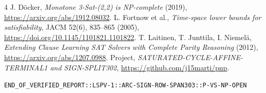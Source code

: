 \documentclass[11pt]{article}
\begin{document}
\begin{thebibliography}{4}
 J. D\"ocker, \emph{Monotone 3-Sat-(2,2) is NP-complete} (2019), \url{https://arxiv.org/abs/1912.08032}.
 L. Fortnow et al., \emph{Time-space lower bounds for satisfiability}, JACM 52(6), 835--865 (2005), \url{https://doi.org/10.1145/1101821.1101822}.
 T. Laitinen, T. Junttila, I. Niemel\"a, \emph{Extending Clause Learning SAT Solvers with Complete Parity Reasoning} (2012), \url{https://arxiv.org/abs/1207.0988}.
 Project, \emph{SATURATED-CYCLE-AFFINE-TERMINAL1 and SIGN-SPLIT302}, \url{https://github.com/j15marti/pnp}.
\end{thebibliography}
\noindent\texttt{END\_OF\_VERIFIED\_REPORT::LSPV-1::ARC-SIGN-ROW-SPAN303::P-VS-NP-OPEN}
\end{document}
